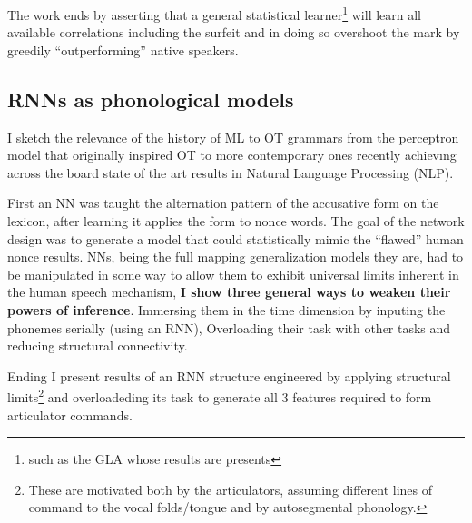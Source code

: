 \documentclass[a4paper,12pt]{article}
\begin{document}
The work ends by asserting that a general statistical learner\footnote{such as the GLA whose results
are presents} will learn all available correlations including the surfeit and in doing so overshoot
the mark by greedily ``outperforming'' native speakers.

\subsection{RNNs as phonological models}

I sketch the relevance of the history of ML to OT grammars from the perceptron model that originally
inspired OT to more contemporary ones recently achievıng across the board state of the art results
in Natural Language Processing (NLP).

First an NN was taught the alternation pattern of the accusative form on the lexicon, after
learning it applies the form to nonce words. The goal of the network design was to generate a model
that could statistically mimic the ``flawed'' human nonce results. NNs, being the full mapping
generalization models they are, had to be manipulated in some way to allow them to exhibit
universal limits inherent in the human speech mechanism, \textbf{I show three general ways to
weaken their powers of inference}. Immersing them in the time dimension by inputing the phonemes
serially (using an RNN), Overloading their task with other tasks and reducing structural connectivity.

Ending I present results of an RNN structure engineered by applying structural limits\footnote{These
are motivated both by the articulators, assuming different lines of command to the vocal
folds/tongue and by autosegmental phonology.} and overloadeding its task to generate all 3 features
required to form articulator commands.

\pagebreak


\nocite{*}

\end{document}
